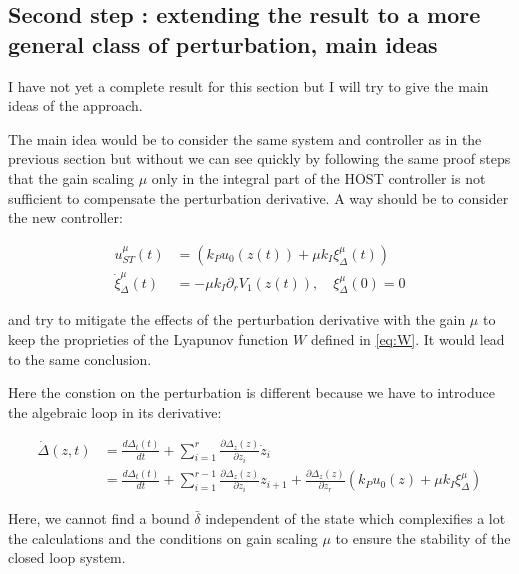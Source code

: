 \subsection{Second step : extending the result to a more general class of perturbation, main ideas}

I have not yet a complete result for this section but I will try to give the main ideas of the approach.

The main idea would be to consider the same system and controller as in the previous section but without
we can see quickly by following the same proof steps that the gain scaling \(\mu\) only in the integral part
of the HOST controller is not sufficient to compensate the perturbation derivative. A way should be to consider 
the new controller:

\begin{align}
    u_{ST}^{\mu}(t) &= \left(k_P u_0(z(t)) + \mu k_I \xi^{\mu}_{\Delta}(t)\right) \\
    \dot{\xi}^{\mu}_{\Delta}(t) &= -\mu k_I \partial_r V_1(z(t)), \quad \xi^{\mu}_{\Delta}(0) = 0
\end{align}

and try to mitigate the effects of the perturbation derivative with the gain \(\mu\) to keep the proprieties
of the Lyapunov function \(W\) defined in \ref{eq:W}. It would lead to the same conclusion.


Here the constion on the perturbation is different because we have to introduce the algebraic loop in its derivative:

\begin{align}
    \dot{\Delta}(z, t) &= \frac{d\Delta_t(t)}{dt} + \sum_{i=1}^{r} \frac{\partial \Delta_z(z)}{\partial z_i} \dot{z}_i \\
    &= \frac{d\Delta_t(t)}{dt} + \sum_{i=1}^{r-1} \frac{\partial \Delta_z(z)}{\partial z_i} z_{i+1} + \frac{\partial \Delta_z(z)}{\partial z_r} (k_P u_0(z) + \mu k_I \xi^{\mu}_{\Delta})
\end{align}

Here, we cannot find a bound \(\bar{\delta}\) independent of the state which complexifies a lot 
the calculations and the conditions on gain scaling \(\mu\) to ensure the stability of the closed loop system.

\newpage
